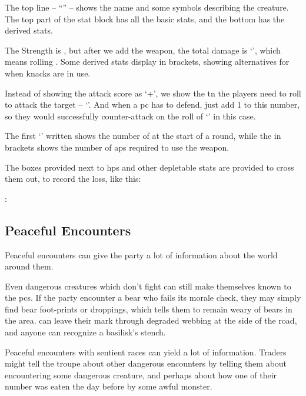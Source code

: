 \begin{multicols}{2}
\ifodd\value{r4}
  \humanthief
\else
  \humansoldier
\fi

The top line -- ``\name'' -- shows the name and some symbols describing the creature.
The top part of the stat block has all the basic stats, and the bottom has the derived stats.

The Strength is , but after we add the weapon, the total damage is `', which means rolling .
Some derived stats display in brackets, showing alternatives for when knacks are in use.

Instead of showing the attack score as `+', we show the \gls{tn} the players need to roll to attack the target -- `'.
And when a \gls{pc} has to defend, just add 1 to this number, so they would successfully counter-attack on the roll of
`' in this case.

The first `' written shows the number of  at the start of a round, while the  in brackets shows the number of \glspl{ap} required to use the weapon.

The boxes provided next to \glspl{hp} and other depletable stats are provided to cross them out, to record the loss, like this: 

 :\addtocounter{hp}{-3}
\Repeat{\value{hp}}{\sqn}

\subsection{Peaceful Encounters}

Peaceful encounters can give the party a lot of information about the world around them.

Even dangerous creatures which don't fight can still make themselves known to the \glspl{pc}.
If the party encounter a bear who fails its morale check, they may simply find bear foot-prints or droppings, which tells them to remain weary of bears in the area.
\iftoggle{aif}{Chitincrawler}{Giant spiders}
can leave their mark through degraded webbing at the side of the road, and anyone can recognize a basilisk's stench.

Peaceful encounters with sentient races can yield a lot of information.
Traders might tell the troupe about other dangerous encounters by telling them about encountering some dangerous creature, and perhaps about how one of their number was eaten the day before by some awful monster.


\end{multicols}
